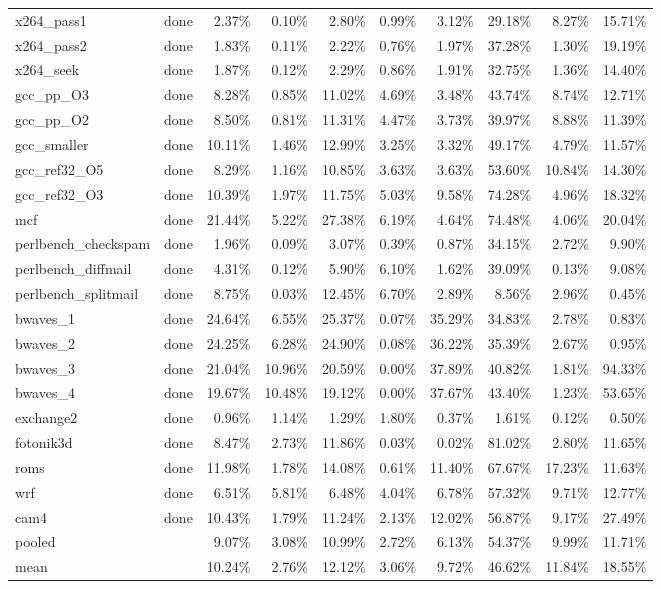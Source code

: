 \documentclass[10pt,a4paper,landscape]{article}
\begin{document}
{\begin{longtable}{llrrrrrrrr}
x264\_pass1 & done & 2.37\% & 0.10\% & 2.80\% & 0.99\% & 3.12\% & 29.18\% & 8.27\% & 15.71\% \\
x264\_pass2 & done & 1.83\% & 0.11\% & 2.22\% & 0.76\% & 1.97\% & 37.28\% & 1.30\% & 19.19\% \\
x264\_seek & done & 1.87\% & 0.12\% & 2.29\% & 0.86\% & 1.91\% & 32.75\% & 1.36\% & 14.40\% \\
gcc\_pp\_O3 & done & 8.28\% & 0.85\% & 11.02\% & 4.69\% & 3.48\% & 43.74\% & 8.74\% & 12.71\% \\
gcc\_pp\_O2 & done & 8.50\% & 0.81\% & 11.31\% & 4.47\% & 3.73\% & 39.97\% & 8.88\% & 11.39\% \\
gcc\_smaller & done & 10.11\% & 1.46\% & 12.99\% & 3.25\% & 3.32\% & 49.17\% & 4.79\% & 11.57\% \\
gcc\_ref32\_O5 & done & 8.29\% & 1.16\% & 10.85\% & 3.63\% & 3.63\% & 53.60\% & 10.84\% & 14.30\% \\
gcc\_ref32\_O3 & done & 10.39\% & 1.97\% & 11.75\% & 5.03\% & 9.58\% & 74.28\% & 4.96\% & 18.32\% \\
mcf & done & 21.44\% & 5.22\% & 27.38\% & 6.19\% & 4.64\% & 74.48\% & 4.06\% & 20.04\% \\
perlbench\_checkspam & done & 1.96\% & 0.09\% & 3.07\% & 0.39\% & 0.87\% & 34.15\% & 2.72\% & 9.90\% \\
perlbench\_diffmail & done & 4.31\% & 0.12\% & 5.90\% & 6.10\% & 1.62\% & 39.09\% & 0.13\% & 9.08\% \\
perlbench\_splitmail & done & 8.75\% & 0.03\% & 12.45\% & 6.70\% & 2.89\% & 8.56\% & 2.96\% & 0.45\% \\
bwaves\_1 & done & 24.64\% & 6.55\% & 25.37\% & 0.07\% & 35.29\% & 34.83\% & 2.78\% & 0.83\% \\
bwaves\_2 & done & 24.25\% & 6.28\% & 24.90\% & 0.08\% & 36.22\% & 35.39\% & 2.67\% & 0.95\% \\
bwaves\_3 & done & 21.04\% & 10.96\% & 20.59\% & 0.00\% & 37.89\% & 40.82\% & 1.81\% & 94.33\% \\
bwaves\_4 & done & 19.67\% & 10.48\% & 19.12\% & 0.00\% & 37.67\% & 43.40\% & 1.23\% & 53.65\% \\
exchange2 & done & 0.96\% & 1.14\% & 1.29\% & 1.80\% & 0.37\% & 1.61\% & 0.12\% & 0.50\% \\
fotonik3d & done & 8.47\% & 2.73\% & 11.86\% & 0.03\% & 0.02\% & 81.02\% & 2.80\% & 11.65\% \\
roms & done & 11.98\% & 1.78\% & 14.08\% & 0.61\% & 11.40\% & 67.67\% & 17.23\% & 11.63\% \\
wrf & done & 6.51\% & 5.81\% & 6.48\% & 4.04\% & 6.78\% & 57.32\% & 9.71\% & 12.77\% \\
cam4 & done & 10.43\% & 1.79\% & 11.24\% & 2.13\% & 12.02\% & 56.87\% & 9.17\% & 27.49\% \\
\midrule
pooled &  & 9.07\% & 3.08\% & 10.99\% & 2.72\% & 6.13\% & 54.37\% & 9.99\% & 11.71\% \\
mean &  & 10.24\% & 2.76\% & 12.12\% & 3.06\% & 9.72\% & 46.62\% & 11.84\% & 18.55\% \\
\end{longtable}
}
\clearpage
\end{document}

